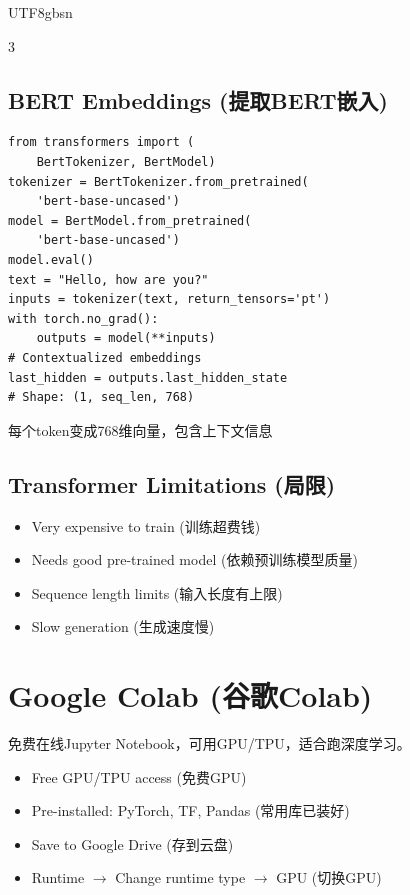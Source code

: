 \documentclass[9pt,landscape,a4paper]{article}
\newcommand{\zhint}[1]{{\scriptsize\color{gray!70!black}#1}}
\begin{document}
\begin{CJK}{UTF8}{gbsn}
\begin{multicols}{3}
\subsection{BERT Embeddings \zhint{(提取BERT嵌入)}}
\begin{lstlisting}
from transformers import (
    BertTokenizer, BertModel)
tokenizer = BertTokenizer.from_pretrained(
    'bert-base-uncased')
model = BertModel.from_pretrained(
    'bert-base-uncased')
model.eval()
text = "Hello, how are you?"
inputs = tokenizer(text, return_tensors='pt')
with torch.no_grad():
    outputs = model(**inputs)
# Contextualized embeddings
last_hidden = outputs.last_hidden_state
# Shape: (1, seq_len, 768)
\end{lstlisting}
\zhint{每个token变成768维向量，包含上下文信息}

\subsection{Transformer Limitations \zhint{(局限)}}
\begin{itemize}[leftmargin=*, nosep, itemsep=0pt]
    \item Very expensive to train \zhint{(训练超费钱)}
    \item Needs good pre-trained model \zhint{(依赖预训练模型质量)}
    \item Sequence length limits \zhint{(输入长度有上限)}
    \item Slow generation \zhint{(生成速度慢)}
\end{itemize}

\section{Google Colab \zhint{(谷歌Colab)}}

\zhint{免费在线Jupyter Notebook，可用GPU/TPU，适合跑深度学习。}
\begin{itemize}[leftmargin=*, nosep, itemsep=0pt]
    \item Free GPU/TPU access \zhint{(免费GPU)}
    \item Pre-installed: PyTorch, TF, Pandas \zhint{(常用库已装好)}
    \item Save to Google Drive \zhint{(存到云盘)}
    \item Runtime $\to$ Change runtime type $\to$ GPU \zhint{(切换GPU)}
\end{itemize}


\end{multicols}
\end{CJK}
\end{document}
